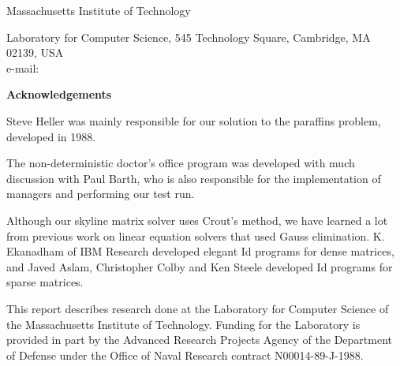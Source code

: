 Massachusetts Institute of Technology

{\footnotesize Laboratory for Computer Science, 545 Technology Square, Cambridge, MA 02139, USA} \\
{\footnotesize e-mail:   }






















\vspace{1in}

{\bf Acknowledgements}

{\footnotesize

Steve Heller was mainly responsible for our solution to the paraffins
problem, developed in 1988.

The non-deterministic doctor's office program was developed with much
discussion with Paul Barth, who is also responsible for the
implementation of managers and performing our test run.

Although our skyline matrix solver uses Crout's method, we have
learned a lot from previous work on linear equation solvers that used
Gauss elimination.  K.  Ekanadham of IBM Research developed elegant Id
programs for dense matrices, and Javed Aslam, Christopher Colby and
Ken Steele developed Id programs for sparse matrices.

This report describes research done at the Laboratory for Computer
Science of the Massachusetts Institute of Technology.  Funding for the
Laboratory is provided in part by the Advanced Research Projects
Agency of the Department of Defense under the Office of Naval Research
contract N00014-89-J-1988.

}


